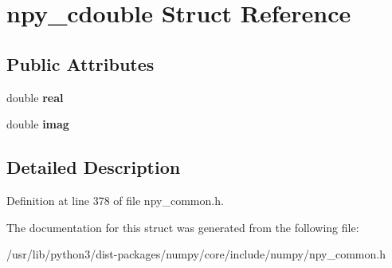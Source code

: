 \hypertarget{structnpy__cdouble}{}\section{npy\+\_\+cdouble Struct Reference}
\label{structnpy__cdouble}
\subsection*{Public Attributes}
\begin{DoxyCompactItemize}
\item 
double {\bfseries real}\hypertarget{structnpy__cdouble_a872c7c66bd199d63a9f1aa85b0cf382b}{}\label{structnpy__cdouble_a872c7c66bd199d63a9f1aa85b0cf382b}

\item 
double {\bfseries imag}\hypertarget{structnpy__cdouble_a46c97954806608c41f6eae16c2c21556}{}\label{structnpy__cdouble_a46c97954806608c41f6eae16c2c21556}

\end{DoxyCompactItemize}


\subsection{Detailed Description}


Definition at line 378 of file npy\+\_\+common.\+h.



The documentation for this struct was generated from the following file\+:\begin{DoxyCompactItemize}
\item 
/usr/lib/python3/dist-\/packages/numpy/core/include/numpy/npy\+\_\+common.\+h\end{DoxyCompactItemize}
